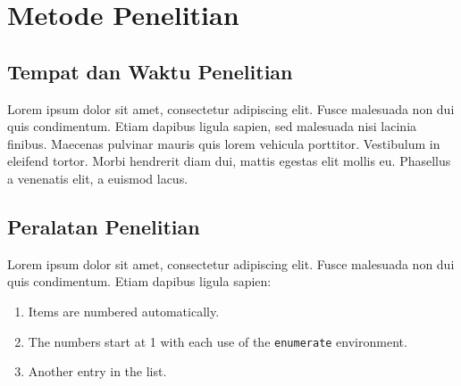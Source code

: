 \chapter{Metode Penelitian}
\section{Tempat dan Waktu Penelitian}
    Lorem ipsum dolor sit amet, consectetur adipiscing elit. Fusce malesuada non dui quis condimentum. Etiam dapibus ligula sapien, sed malesuada nisi lacinia finibus. Maecenas pulvinar mauris quis lorem vehicula porttitor. Vestibulum in eleifend tortor. Morbi hendrerit diam dui, mattis egestas elit mollis eu. Phasellus a venenatis elit, a euismod lacus.\\

\section{Peralatan Penelitian}
    Lorem ipsum dolor sit amet, consectetur adipiscing elit. Fusce malesuada non dui quis condimentum. Etiam dapibus ligula sapien:
    \begin{enumerate}
        \item Items are numbered automatically.
        \item The numbers start at 1 with each use of the \texttt{enumerate} environment.
        \item Another entry in the list.
    \end{enumerate} 

\section{}

